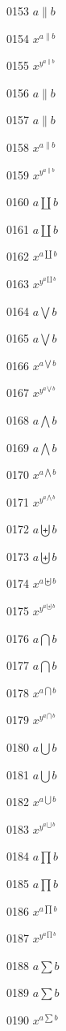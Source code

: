\documentclass{article}
\begin{document}
0153 $\displaystyle a\lVert b$\par
0154 $x^{a\lVert b}$\par
0155 $x^{y^{a\lVert b}}$\par
0156 $a\rVert b$\par
0157 $\displaystyle a\rVert b$\par
0158 $x^{a\rVert b}$\par
0159 $x^{y^{a\rVert b}}$\par
0160 $a\coprod b$\par
0161 $\displaystyle a\coprod b$\par
0162 $x^{a\coprod b}$\par
0163 $x^{y^{a\coprod b}}$\par
0164 $a\bigvee b$\par
0165 $\displaystyle a\bigvee b$\par
0166 $x^{a\bigvee b}$\par
0167 $x^{y^{a\bigvee b}}$\par
0168 $a\bigwedge b$\par
0169 $\displaystyle a\bigwedge b$\par
0170 $x^{a\bigwedge b}$\par
0171 $x^{y^{a\bigwedge b}}$\par
0172 $a\biguplus b$\par
0173 $\displaystyle a\biguplus b$\par
0174 $x^{a\biguplus b}$\par
0175 $x^{y^{a\biguplus b}}$\par
0176 $a\bigcap b$\par
0177 $\displaystyle a\bigcap b$\par
0178 $x^{a\bigcap b}$\par
0179 $x^{y^{a\bigcap b}}$\par
0180 $a\bigcup b$\par
0181 $\displaystyle a\bigcup b$\par
0182 $x^{a\bigcup b}$\par
0183 $x^{y^{a\bigcup b}}$\par
0184 $a\prod b$\par
0185 $\displaystyle a\prod b$\par
0186 $x^{a\prod b}$\par
0187 $x^{y^{a\prod b}}$\par
0188 $a\sum b$\par
0189 $\displaystyle a\sum b$\par
0190 $x^{a\sum b}$\par
\end{document}
